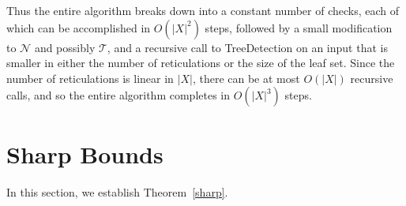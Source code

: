\documentclass[11pt]{amsart}
\begin{document}
Thus the entire algorithm breaks down into a constant number of checks, each of which can be accomplished in $O(|X|^2)$ steps, followed by a small modification to ${{\mathcal N}}$ and possibly ${{\mathcal T}}$, and a recursive call to {\sc TreeDetection} on an input that is smaller in either the number of reticulations or the size of the leaf set. Since the number of reticulations is linear in $|X|$, there can be at most $O(|X|)$ recursive calls, and so the entire algorithm completes in $O(|X|^3)$ steps.

\section{Sharp Bounds}
\label{visible}

In this section, we establish Theorem~\ref{sharp}.
\end{document}
